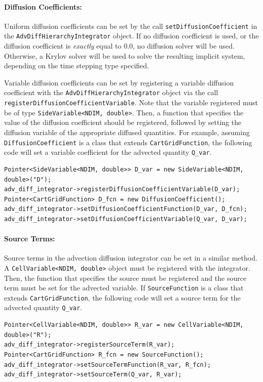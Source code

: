 \documentclass{article}
\begin{document}
\paragraph{Diffusion Coefficients:}
Uniform diffusion coefficients can be set by the call \verb|setDiffusionCoefficient| in the \verb|AdvDiffHierarchyIntegrator| object. If no diffusion coefficient is used, or the diffusion coefficient is \emph{exactly} equal to 0.0, no diffusion solver will be used. Otherwise, a Krylov solver will be used to solve the resulting implicit system, depending on the time stepping type specified.

Variable diffusion coefficients can be set by registering a variable diffusion coefficient with the \verb|AdvDiffHierarchyIntegrator| object via the call \verb|registerDiffusionCoefficientVariable|. Note that the variable registered must be of type \verb|SideVariable<NDIM, double>|. Then, a function that specifies the value of the diffusion coefficient should be registered, followed by setting the diffusion variable of the appropriate diffused quantities. For example, assuming \verb|DiffusionCoefficient| is a class that extends \verb|CartGridFunction|, the following code will set a variable coefficient for the advected quantity \verb|Q_var|.
\begin{verbatim}
Pointer<SideVariable<NDIM, double>> D_var = new SideVariable<NDIM, double>("D");
adv_diff_integrator->registerDiffusionCoefficientVariable(D_var);
Pointer<CartGridFunction> D_fcn = new DiffusionCoefficient();
adv_diff_integrator->setDiffusionCoefficientFunction(D_var, D_fcn);
adv_diff_integrator->setDiffusionCoefficientVariable(Q_var, D_var);
\end{verbatim}

\paragraph{Source Terms:}
Source terms in the advection diffusion integrator can be set in a similar method. A \verb|CellVariable<NDIM, double>| object must be registered with the integrator. Then, the function that specifies the source must be registered and the source term must be set for the advected variable. If \verb|SourceFunction| is a class that extends \verb|CartGridFunction|, the following code will set a source term for the advected quantity \verb|Q_var|.
\begin{verbatim}
Pointer<CellVariable<NDIM, double>> R_var = new CellVariable<NDIM, double>("R");
adv_diff_integrator->registerSourceTerm(R_var);
Pointer<CartGridFunction> R_fcn = new SourceFunction();
adv_diff_integrator->setSourceTermFunction(R_var, R_fcn);
adv_diff_integrator->setSourceTerm(Q_var, R_var);
\end{verbatim}
\end{document}
